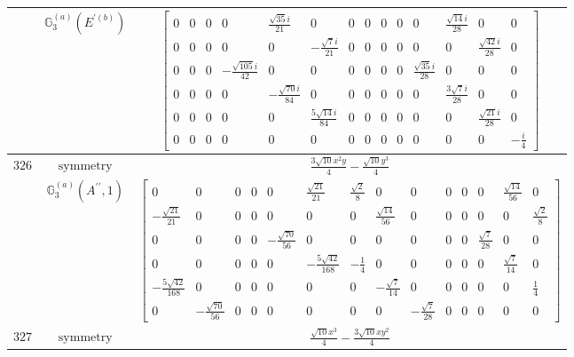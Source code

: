 \documentclass[fleqn,8pt,landscape]{jsarticle}
\begin{document}
\begin{longtable}{ccc}
$  $ & $ \mathbb{G}_{3}^{(a)}(E^{\prime(b)}) $ & $ \begin{bmatrix} 0 & 0 & 0 & 0 & \frac{\sqrt{35} i}{21} & 0 & 0 & 0 & 0 & 0 & 0 & \frac{\sqrt{14} i}{28} & 0 & 0 \\ 0 & 0 & 0 & 0 & 0 & - \frac{\sqrt{7} i}{21} & 0 & 0 & 0 & 0 & 0 & 0 & \frac{\sqrt{42} i}{28} & 0 \\ 0 & 0 & 0 & - \frac{\sqrt{105} i}{42} & 0 & 0 & 0 & 0 & 0 & 0 & \frac{\sqrt{35} i}{28} & 0 & 0 & 0 \\ 0 & 0 & 0 & 0 & - \frac{\sqrt{70} i}{84} & 0 & 0 & 0 & 0 & 0 & 0 & \frac{3 \sqrt{7} i}{28} & 0 & 0 \\ 0 & 0 & 0 & 0 & 0 & \frac{5 \sqrt{14} i}{84} & 0 & 0 & 0 & 0 & 0 & 0 & \frac{\sqrt{21} i}{28} & 0 \\ 0 & 0 & 0 & 0 & 0 & 0 & 0 & 0 & 0 & 0 & 0 & 0 & 0 & - \frac{i}{4} \end{bmatrix} $ \\ \hline
$ 326 $ & $ \text{symmetry} $ & $ \frac{3 \sqrt{10} x^{2} y}{4} - \frac{\sqrt{10} y^{3}}{4} $ \\
$  $ & $ \mathbb{G}_{3}^{(a)}(A^{\prime\prime},1) $ & $ \begin{bmatrix} 0 & 0 & 0 & 0 & 0 & \frac{\sqrt{21}}{21} & \frac{\sqrt{2}}{8} & 0 & 0 & 0 & 0 & 0 & \frac{\sqrt{14}}{56} & 0 \\ - \frac{\sqrt{21}}{21} & 0 & 0 & 0 & 0 & 0 & 0 & \frac{\sqrt{14}}{56} & 0 & 0 & 0 & 0 & 0 & \frac{\sqrt{2}}{8} \\ 0 & 0 & 0 & 0 & - \frac{\sqrt{70}}{56} & 0 & 0 & 0 & 0 & 0 & 0 & \frac{\sqrt{7}}{28} & 0 & 0 \\ 0 & 0 & 0 & 0 & 0 & - \frac{5 \sqrt{42}}{168} & - \frac{1}{4} & 0 & 0 & 0 & 0 & 0 & \frac{\sqrt{7}}{14} & 0 \\ - \frac{5 \sqrt{42}}{168} & 0 & 0 & 0 & 0 & 0 & 0 & - \frac{\sqrt{7}}{14} & 0 & 0 & 0 & 0 & 0 & \frac{1}{4} \\ 0 & - \frac{\sqrt{70}}{56} & 0 & 0 & 0 & 0 & 0 & 0 & - \frac{\sqrt{7}}{28} & 0 & 0 & 0 & 0 & 0 \end{bmatrix} $ \\ \hline
$ 327 $ & $ \text{symmetry} $ & $ \frac{\sqrt{10} x^{3}}{4} - \frac{3 \sqrt{10} x y^{2}}{4} $ \\

\end{longtable}
\end{document}
